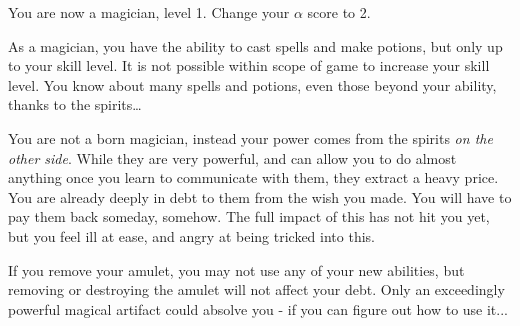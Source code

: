 \documentclass[green]{NeptuneBall}
\begin{document}
\name{\gSpirits{}}

You are now a magician, level 1. Change your $\alpha$ score to 2.

As a magician, you have the ability to cast spells and make potions, but only up to your skill level. It is not possible within scope of game to increase your skill level. You know about many spells and potions, even those beyond your ability, thanks to the spirits\ldots{}

You are not a born magician, instead your power comes from the spirits \emph{on the other side}. While they are very powerful, and can allow you to do almost anything once you learn to communicate with them, they extract a heavy price. You are already deeply in debt to them from the wish you made. You will have to pay them back someday, somehow. The full impact of this has not hit you yet, but you feel ill at ease, and angry at being tricked into this.

If you remove your amulet, you may not use any of your new abilities, but removing or destroying the amulet will not affect your debt. Only an exceedingly powerful magical artifact could absolve you - if you can figure out how to use it...
\end{document}
